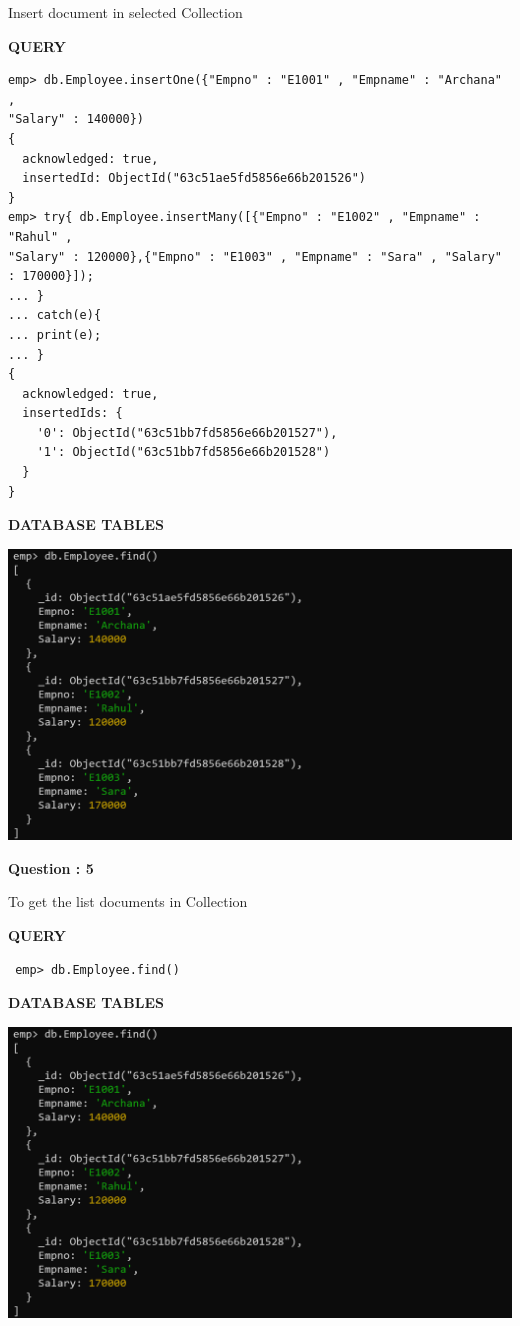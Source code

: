 \documentclass[a4paper,12pt]{report}
\begin{document}
Insert document in selected Collection
\begin{flushleft}
\textbf{QUERY }
\end{flushleft}
 \begin{verbatim}
emp> db.Employee.insertOne({"Empno" : "E1001" , "Empname" : "Archana" ,
"Salary" : 140000})
{
  acknowledged: true,
  insertedId: ObjectId("63c51ae5fd5856e66b201526")
}
emp> try{ db.Employee.insertMany([{"Empno" : "E1002" , "Empname" : "Rahul" ,
"Salary" : 120000},{"Empno" : "E1003" , "Empname" : "Sara" , "Salary" : 170000}]);
... }
... catch(e){
... print(e);
... }
{
  acknowledged: true,
  insertedIds: {
    '0': ObjectId("63c51bb7fd5856e66b201527"),
    '1': ObjectId("63c51bb7fd5856e66b201528")
  }
}
\end{verbatim}
\newpage
\begin{flushleft}
\textbf{DATABASE TABLES}
\end{flushleft}
\includegraphics[scale=0.5]{M4.2.png}
\begin{flushleft}
    \textbf{Question : 5}
\end{flushleft}
To get the list documents in Collection
\begin{flushleft}
\textbf{QUERY }
\end{flushleft}
 \begin{verbatim}
 emp> db.Employee.find()
\end{verbatim}
\begin{flushleft}
\textbf{DATABASE TABLES}
\end{flushleft}
\includegraphics[scale=0.5]{M4.2.png}
\end{document}
